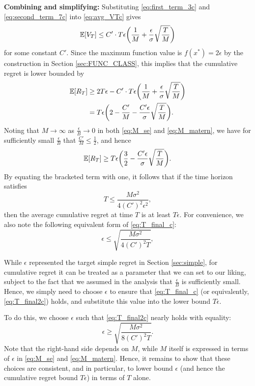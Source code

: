 \documentclass[english,onecolumn,final,11pt]{IEEEtran} %
\begin{document}
\textbf{Combining and simplifying:} Substituting \eqref{eq:first_term_3c} and \eqref{eq:second_term_7c} into \eqref{eq:avg_VTc} gives
\begin{equation}
	\mathbb{E}[V_T] \le C'\cdot T\epsilon \bigg(\frac{1}{M} + \frac{\epsilon}{
	\sigma}\sqrt{\frac{T}{M}}\bigg)
\end{equation}
for some constant $C'$.  Since the maximum function value is $f(x^*) = 2\epsilon$ by the construction in Section \ref{sec:FUNC_CLASS}, this implies that the cumulative regret is lower bounded by
\begin{align}
\mathbb{E}[R_T] 
	&\ge 2T\epsilon -  C'\cdot T\epsilon \bigg(\frac{1}{M} + \frac{\epsilon}{\sigma}\sqrt{\frac{T}{M}}\bigg) \\
	&= T\epsilon\bigg( 2 - \frac{C'}{M} - \frac{C'\epsilon}{\sigma}\sqrt{\frac{T}{M}} \bigg). 
\end{align}
Noting that $M \to \infty$ as $\frac{\epsilon}{B} \to 0$ in both \eqref{eq:M_se} and \eqref{eq:M_matern}, we have for sufficiently small $\frac{\epsilon}{B}$ that $\frac{C'}{M} \le \frac{1}{2}$, and hence 
\begin{equation}
    \mathbb{E}[R_T] \ge T\epsilon\bigg( \frac{3}{2} - \frac{C'\epsilon}{\sigma}\sqrt{\frac{T}{M}} \bigg). \label{eq:RT_LBc}
\end{equation}
By equating the bracketed term with one, it follows that if the time horizon satisfies
\begin{equation}
	T \le \frac{M \sigma^2}{4(C')^2 \epsilon^2}, \label{eq:T_final_c}
\end{equation}
then the average cumulative regret at time $T$ is at least $T\epsilon$.  For convenience, we also note the following equivalent form of \eqref{eq:T_final_c}:
\begin{equation}
	\epsilon \le \sqrt{\frac{M \sigma^2}{4(C')^2 T}}, \label{eq:T_final2c}
\end{equation}

While $\epsilon$ represented the target simple regret in Section \ref{sec:simple}, for cumulative regret it can be treated as a parameter that we can set to our liking, subject to the fact that we assumed in the analysis that $\frac{\epsilon}{B}$ is sufficiently small.  Hence, we simply need to choose $\epsilon$ to ensure that \eqref{eq:T_final_c} (or equivalently, \eqref{eq:T_final2c}) holds, and substitute this value into the lower bound $T\epsilon$.

To do this, we choose $\epsilon$ such that \eqref{eq:T_final2c} nearly holds with equality:
\begin{equation}
    \epsilon \ge \sqrt{\frac{M\sigma^2}{8 (C')^2 T}}. \label{eq:eps_choice}
\end{equation}
Note that the right-hand side depends on $M$, while $M$ itself is expressed in terms of $\epsilon$ in \eqref{eq:M_se} and \eqref{eq:M_matern}. Hence, it remains to show that these choices are consistent, and in particular, to lower bound $\epsilon$ (and hence the cumulative regret bound $T\epsilon$) in terms of $T$ alone.
\end{document}
